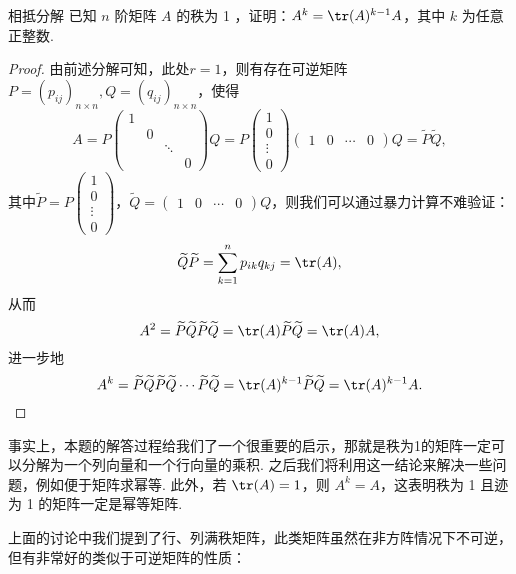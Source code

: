\begin{example}{}{相抵分解}
    已知 $n$ 阶矩阵 $A$ 的秩为 1 ，证明：$A^k=\tr(A)^{k-1}A$，其中 $k$ 为任意正整数.
\end{example}

\begin{proof}
    由前述分解可知，此处$r=1$，则有存在可逆矩阵 $P=(p_{ij})_{n \times n},Q=(q_{ij})_{n \times n}$，使得
    \[A=P\begin{pmatrix}
            1 &   &        &   \\
              & 0 &        &   \\
              &   & \ddots &   \\
              &   &        & 0
        \end{pmatrix} Q=P\begin{pmatrix}
            1 \\ 0 \\ \vdots \\ 0
        \end{pmatrix}\begin{pmatrix}
            1 & 0 & \cdots & 0
        \end{pmatrix} Q=\widetilde{P} \widetilde{Q},\]
    其中$\widetilde{P}=P\begin{pmatrix}
            1 \\ 0 \\ \vdots \\ 0
        \end{pmatrix}$，$\widetilde{Q}=\begin{pmatrix}
            1 & 0 & \cdots & 0
        \end{pmatrix} Q$，则我们可以通过暴力计算不难验证：
    \[\widetilde{Q} \widetilde{P}=\sum_{k=1}^{n} p_{i k} q_{k j}=\tr(A),\]
    从而
    \[A^{2}=\widetilde{P} \widetilde{Q} \widetilde{P} \widetilde{Q}=\tr(A) \widetilde{P} \widetilde{Q}=\tr(A) A,\]
    进一步地
    \[A^{k}=\widetilde{P} \widetilde{Q} \widetilde{P} \widetilde{Q} \cdots \widetilde{P} \widetilde{Q}=\tr(A)^{k-1} \widetilde{P} \widetilde{Q}=\tr(A)^{k-1} A.\]
\end{proof}

事实上，本题的解答过程给我们了一个很重要的启示，那就是秩为1的矩阵一定可以分解为一个列向量和一个行向量的乘积. 之后我们将利用这一结论来解决一些问题，例如便于矩阵求幂等. 此外，若 $\tr(A) = 1$，则 $A^k = A$，这表明秩为 1 且迹为 1 的矩阵一定是幂等矩阵.

上面的讨论中我们提到了行、列满秩矩阵，此类矩阵虽然在非方阵情况下不可逆，但有非常好的类似于可逆矩阵的性质：


